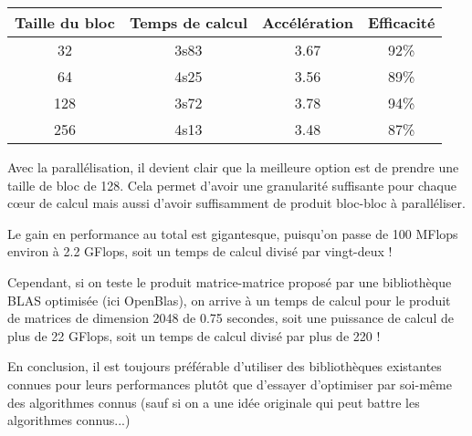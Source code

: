 \documentclass[fleqn,11pt]{article}
\begin{document}
\begin{tabular}{|c|c|c|c|}\hline 
    Taille du bloc & Temps de calcul & Accélération & Efficacité \\ \hline \hline
              32                  &      3s83   &  3.67 &   92\%  \\ \hline
              64                  &      4s25   &  3.56 &   89\%  \\ \hline
              128                 &      3s72   &  3.78 &   94\%  \\ \hline 
              256                 &      4s13   &  3.48 &   87\%  \\ \hline
\end{tabular}

Avec la parallélisation, il devient clair que la meilleure option est de prendre une taille de bloc de 128. Cela permet d'avoir une
granularité suffisante pour chaque c{\oe}ur de calcul mais aussi d'avoir suffisamment de produit bloc-bloc à paralléliser.

Le gain en performance au total est gigantesque, puisqu'on passe de 100 MFlops environ à 2.2 GFlops, soit un temps de calcul divisé par
vingt-deux !

Cependant, si on teste le produit matrice-matrice proposé par une bibliothèque BLAS optimisée (ici OpenBlas), on arrive à un temps de calcul 
pour le produit de matrices de dimension 2048 de 0.75 secondes, soit une puissance de calcul de plus de 22 GFlops, soit un temps de calcul 
divisé par plus de 220 ! 

En conclusion, il est toujours préférable d'utiliser des bibliothèques existantes connues pour leurs performances plutôt que d'essayer
d'optimiser par soi-même des algorithmes connus (sauf si on a une idée originale qui peut battre les algorithmes connus...)
\end{document}
